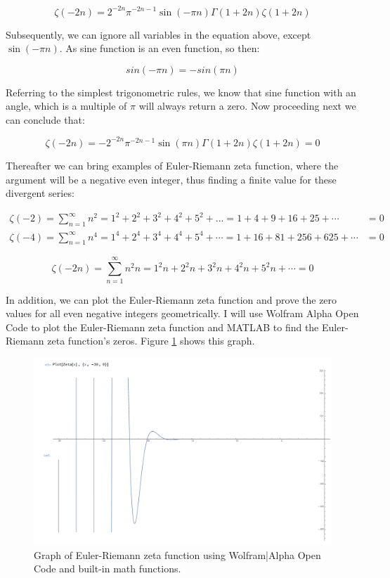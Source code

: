 \documentclass[a4paper]{article}
\begin{document}
\begin{equation}
  \zeta(-2n)=2^{-2n}\pi^{-2n-1}\sin(-\pi n)\Gamma(1+2n)\zeta(1+2n)
  \end{equation}

Subsequently, we can ignore all variables in the equation above, except
\(\sin(-\pi n)\). As sine function is an even function, so then:

\begin{equation}
  sin(-\pi n)=-sin(\pi n)
  \end{equation}

Referring to the simplest trigonometric rules, we know that sine function with
an angle, which is a multiple of \(\pi\) will always return a zero. Now proceeding
next we can conclude that: 

\begin{equation*}
  \zeta(-2n)=-2^{-2n}\pi^{-2n-1}\sin(\pi n)\Gamma(1+2n)\zeta(1+2n)=0
  \end{equation*}

Thereafter we can bring examples of Euler-Riemann zeta function, where the
argument will be a negative even integer, thus finding a finite value for these
divergent series: 

\begin{align*}
  \zeta(-2)=\sum_{n=1}^{\infty} n^2=1^2+2^2+3^2+4^2+5^2+...=1+4+9+16+25+\cdots&=0\\
  \zeta(-4)=\sum_{n=1}^{\infty} n^4=1^4+2^4+3^4+4^4+5^4+\cdots=1+16+81+256+625+\cdots&=0
\end{align*}

\begin{equation}
\zeta(-2n)=\sum_{n=1}^{\infty} n^2n=1^2n+2^2n+3^2n+4^2n+5^2n+\cdots=0
  \end{equation}

In addition, we can plot the Euler-Riemann zeta function and prove the zero
values for all even negative integers geometrically. I will use Wolfram Alpha
Open Code to plot the Euler-Riemann zeta function and MATLAB to find the
Euler-Riemann zeta function's zeros. Figure \ref{fig:org7519c02} shows this graph. 

\begin{figure}[htbp]
\centering
\includegraphics[width=.9\linewidth]{./zeros.png}
\caption{\label{fig:org7519c02}
Graph of Euler-Riemann zeta function using Wolfram|Alpha Open Code and built-in math functions.}
\end{figure}
\end{document}
